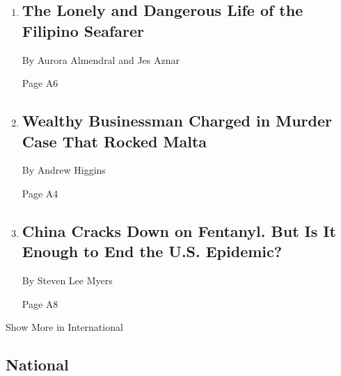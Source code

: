 \begin{enumerate}
\def\labelenumi{\arabic{enumi}.}
\item
  \href{/2019/11/30/world/asia/philippines-mariners-cargo-ships.html}{}

  \hypertarget{the-lonely-and-dangerous-life-of-the-filipino-seafarer-1}{%
  \subsection{The Lonely and Dangerous Life of the Filipino
  Seafarer}\label{the-lonely-and-dangerous-life-of-the-filipino-seafarer-1}}

  By Aurora Almendral and Jes Aznar

  Page A6
\item
  \href{/2019/11/30/world/europe/malta-journalist-killing.html}{}

  \hypertarget{wealthy-businessman-charged-in-murder-case-that-rocked-malta}{%
  \subsection{Wealthy Businessman Charged in Murder Case That Rocked
  Malta}\label{wealthy-businessman-charged-in-murder-case-that-rocked-malta}}

  By Andrew Higgins

  Page A4
\item
  \href{/2019/12/01/world/asia/china-fentanyl-crackdown.html}{}

  \hypertarget{china-cracks-down-on-fentanyl-but-is-it-enough-to-end-the-us-epidemic-1}{%
  \subsection{China Cracks Down on Fentanyl. But Is It Enough to End the
  U.S.
  Epidemic?}\label{china-cracks-down-on-fentanyl-but-is-it-enough-to-end-the-us-epidemic-1}}

  By Steven Lee Myers

  Page A8
\end{enumerate}

Show More in International

\hypertarget{national}{%
\subsection{National}\label{national}}

